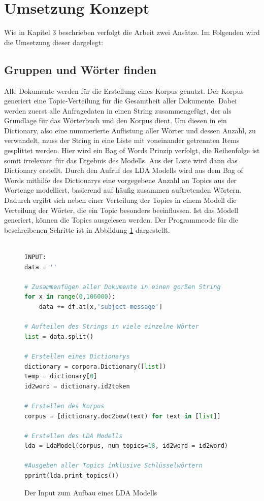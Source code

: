 \documentclass[german,version-2020-11]{uzl-thesis}
\begin{document}
\section{Umsetzung Konzept}
Wie in Kapitel 3 beschrieben verfolgt die Arbeit zwei Ansätze. Im Folgenden wird die Umsetzung dieser dargelegt: \\
 
\subsection{Gruppen und Wörter finden}
Alle Dokumente werden für die Erstellung eines Korpus genutzt. Der Korpus generiert eine Topic-Verteilung für die Gesamtheit aller Dokumente. Dabei werden zuerst alle Anfragedaten in einen String zusammengefügt, der als Grundlage für das Wörterbuch und den Korpus dient. Um diesen in ein Dictionary, also eine nummerierte Auflistung aller Wörter und dessen Anzahl, zu verwandelt, muss der String in eine Liste mit voneinander getrennten Items gesplittet werden. Hier wird ein Bag of Words Prinzip verfolgt, die Reihenfolge ist somit irrelevant für das Ergebnis des Modells. Aus der Liste wird dann das Dictionary erstellt. Durch den Aufruf des LDA Modells wird aus dem Bag of Words mithilfe des Dictionarys eine vorgegebene Anzahl an Topics aus der Wortenge modelliert, basierend auf häufig zusammen auftretenden Wörtern. Dadurch ergibt sich neben einer Verteilung der Topics in einem Modell die Verteilung der Wörter, die ein Topic besonders beeinflussen. Ist das Modell generiert, können die Topics ausgelesen werden. Der Programmcode für die beschreibenen Schritte ist in Abbildung \ref{fig:codeinput} dargestellt.\\
\\

\begin{figure}[H]
\begin{lstlisting}[language=Python, basicstyle=\small]
INPUT:
data = ''

# Zusammenfügen aller Dokumente in einen gorßen String
for x in range(0,106000):
    data += df.at[x,'subject-message']

# Aufteilen des Strings in viele einzelne Wörter
list = data.split()

# Erstellen eines Dictionarys
dictionary = corpora.Dictionary([list])
temp = dictionary[0]
id2word = dictionary.id2token

# Erstellen des Korpus
corpus = [dictionary.doc2bow(text) for text in [list]]

# Erstellen des LDA Modells
lda = LdaModel(corpus, num_topics=18, id2word = id2word)

#Ausgeben aller Topics inklusive Schlüsselwörtern
pprint(lda.print_topics())

\end{lstlisting}
\caption{Der Input zum Aufbau eines LDA Modells}
\label{fig:codeinput}
\end{figure}
\end{document}
